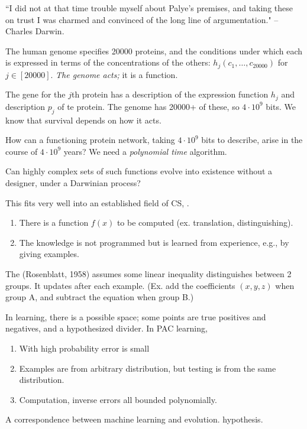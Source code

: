 ``I did not at that time trouble myself about Palye's premises, and taking these on trust I was charmed and convinced of the long line of argumentation." --Charles Darwin.

The human genome specifies 20000 proteins, and the conditions under which each is expressed in terms of the concentrations of the others: $h_j(c_1,\ldots, c_{20000})$ for $j\in [20000]$. {\it The genome acts;} it is a function.

The gene for the $j$th protein has a description of the expression function $h_j$ and description $p_j$ of te protein. The genome has 20000+ of these, so $4\cdot 10^9$ bits.  We know that survival depends on how it acts.

How can a functioning protein network, taking $4\cdot 10^9$ bits to describe, arise in the course of $4\cdot 10^9$ years? We need a {\it polynomial time} algorithm.

Can highly complex sets of such functions evolve into existence without a designer, under a Darwinian process?

This fits very well into an established field of CS, . %
\begin{enumerate}
\item
There is a function $f(x)$ to be computed (ex. translation, distinguishing).
\item
The knowledge is not programmed but is learned from experience, e.g., by giving examples. 
\end{enumerate}

The  (Rosenblatt, 1958) assumes some linear inequality distinguishes between 2 groups. It updates after each example. (Ex. add the coefficients $(x,y,z)$ when group A, and subtract the equation when group B.)

In learning, there is a possible space; some points are true positives and negatives, and a hypothesized divider. In PAC learning,
\begin{enumerate}
\item
With high probability error is small
\item
Examples are from arbitrary distribution, but testing is from the same distribution.
\item Computation, inverse errors all bounded polynomially.
\end{enumerate}

A correspondence between machine learning and evolution.
hypothesis.


